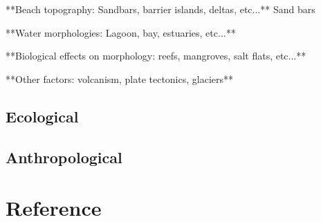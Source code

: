 \documentclass{article}
\begin{document}
\par{**Beach topography: Sandbars, barrier islands, deltas, etc...**
Sand bars }

\par{**Water morphologies: Lagoon, bay, estuaries, etc...**}


\newpage
{}
\fancyfoot[C]{\thepage} 
\thispagestyle{fancy}

\par{**Biological effects on morphology: reefs, mangroves, salt flats, etc...**}

\par{**Other factors: volcanism, plate tectonics, glaciers**}



\newpage
{}
\fancyfoot[C]{\thepage} 
\thispagestyle{fancy}

\subsection{Ecological}
\subsection{Anthropological}

\newpage
{}
\fancyfoot[C]{\thepage} 
\thispagestyle{fancy}
\section{Reference}
\end{document}
